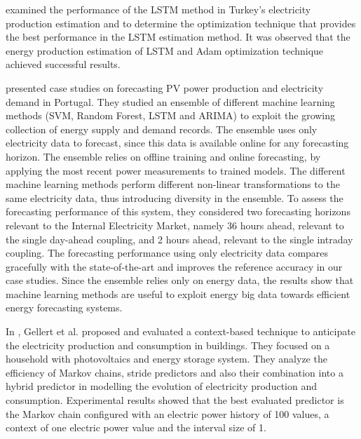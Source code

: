 \cite{9848724} examined the performance of the LSTM method in Turkey's electricity production estimation and to determine the optimization technique that provides the best performance in the LSTM estimation method.
It was observed that the energy production estimation of LSTM and Adam optimization technique achieved successful results. 

\cite{9248865} presented case studies on forecasting PV power production and electricity demand in Portugal.
They studied an ensemble of different machine learning methods (SVM, Random Forest, LSTM and ARIMA) to exploit the growing collection of energy supply and demand records.
The ensemble uses only electricity data to forecast, since this data is available online for any forecasting horizon.
The ensemble relies on offline training and online forecasting, by applying the most recent power measurements to trained models.
The different machine learning methods perform different non-linear transformations to the same electricity data, thus introducing diversity in the ensemble.
To assess the forecasting performance of this system, they considered two forecasting horizons relevant to the Internal Electricity Market, namely 36 hours ahead, relevant to the single day-ahead coupling, and 2 hours ahead, relevant to the single intraday coupling.
The forecasting performance using only electricity data compares gracefully with the state-of-the-art and improves the reference accuracy in our case studies.
Since the ensemble relies only on energy data, the results show that machine learning methods are useful to exploit energy big data towards efficient energy forecasting systems.

In \cite{GELLERT2019546}, Gellert et al. proposed and evaluated a context-based technique to anticipate the electricity production and consumption in buildings.
They focused on a household with photovoltaics and energy storage system.
They analyze the efficiency of Markov chains, stride predictors and also their combination into a hybrid predictor in modelling the evolution of electricity production and consumption.
Experimental results showed that the best evaluated predictor is the Markov chain configured with an electric power history of 100 values, a context of one electric power value and the interval size of 1.

